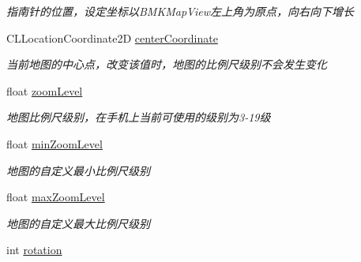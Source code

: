 \begin{DoxyCompactItemize}
\begin{DoxyCompactList}\small\item\em 指南针的位置，设定坐标以\+B\+M\+K\+Map\+View左上角为原点，向右向下增长 \end{DoxyCompactList}\item 
\hypertarget{interface_b_m_k_map_view_aa19c4d034a7861589044326107985632}{C\+L\+Location\+Coordinate2\+D \hyperlink{interface_b_m_k_map_view_aa19c4d034a7861589044326107985632}{center\+Coordinate}}\label{interface_b_m_k_map_view_aa19c4d034a7861589044326107985632}

\begin{DoxyCompactList}\small\item\em 当前地图的中心点，改变该值时，地图的比例尺级别不会发生变化 \end{DoxyCompactList}\item 
\hypertarget{interface_b_m_k_map_view_a5e6c1e21fddd4d6a24194be53f14c27e}{float \hyperlink{interface_b_m_k_map_view_a5e6c1e21fddd4d6a24194be53f14c27e}{zoom\+Level}}\label{interface_b_m_k_map_view_a5e6c1e21fddd4d6a24194be53f14c27e}

\begin{DoxyCompactList}\small\item\em 地图比例尺级别，在手机上当前可使用的级别为3-\/19级 \end{DoxyCompactList}\item 
\hypertarget{interface_b_m_k_map_view_ab504b39a0a908c811a258e058be7eeb9}{float \hyperlink{interface_b_m_k_map_view_ab504b39a0a908c811a258e058be7eeb9}{min\+Zoom\+Level}}\label{interface_b_m_k_map_view_ab504b39a0a908c811a258e058be7eeb9}

\begin{DoxyCompactList}\small\item\em 地图的自定义最小比例尺级别 \end{DoxyCompactList}\item 
\hypertarget{interface_b_m_k_map_view_ae9fce90bc3332cdf0dc477c3959e5e79}{float \hyperlink{interface_b_m_k_map_view_ae9fce90bc3332cdf0dc477c3959e5e79}{max\+Zoom\+Level}}\label{interface_b_m_k_map_view_ae9fce90bc3332cdf0dc477c3959e5e79}

\begin{DoxyCompactList}\small\item\em 地图的自定义最大比例尺级别 \end{DoxyCompactList}\item 
\hypertarget{interface_b_m_k_map_view_a344d3d4be5d00adfc22feaa2ab6869c4}{int \hyperlink{interface_b_m_k_map_view_a344d3d4be5d00adfc22feaa2ab6869c4}{rotation}}\label{interface_b_m_k_map_view_a344d3d4be5d00adfc22feaa2ab6869c4}


\end{DoxyCompactItemize}
